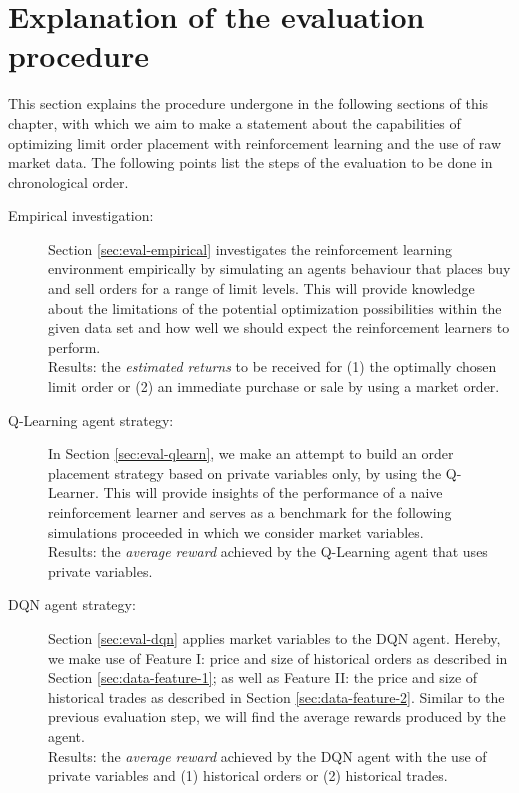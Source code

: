 \section{Explanation of the evaluation procedure}
This section explains the procedure undergone in the following sections of this chapter, with which we aim to make a statement about the capabilities of optimizing limit order placement with reinforcement learning and the use of raw market data.
The following points list the steps of the evaluation to be done in chronological order.
\begin{description}
    \item[Empirical investigation: ]
    Section \ref{sec:eval-empirical} investigates the reinforcement learning environment empirically by simulating an agents behaviour that places buy and sell orders for a range of limit levels.
    This will provide knowledge about the limitations of the potential optimization possibilities within the given data set and how well we should expect the reinforcement learners to perform.
    \\
    Results: the \textit{estimated returns} to be received for (1) the optimally chosen limit order or (2) an immediate purchase or sale by using a market order.
    
    \item[Q-Learning agent strategy: ]
    In Section \ref{sec:eval-qlearn}, we make an attempt to build an order placement strategy based on private variables only, by using the Q-Learner.
    This will provide insights of the performance of a naive reinforcement learner and serves as a benchmark for the following simulations proceeded in which we consider market variables.
    \\
    Results: the \textit{average reward} achieved by the Q-Learning agent that uses private variables.

    \item[DQN agent strategy: ]
    Section \ref{sec:eval-dqn} applies market variables to the DQN agent.
    Hereby, we make use of Feature I: price and size of historical orders as described in Section \ref{sec:data-feature-1}; as well as Feature II: the price and size of historical trades as described in Section \ref{sec:data-feature-2}.
    Similar to the previous evaluation step, we will find the average rewards produced by the agent.
    \\
    Results: the \textit{average reward} achieved by the DQN agent with the use of private variables and (1) historical orders or (2) historical trades.


\end{description}
